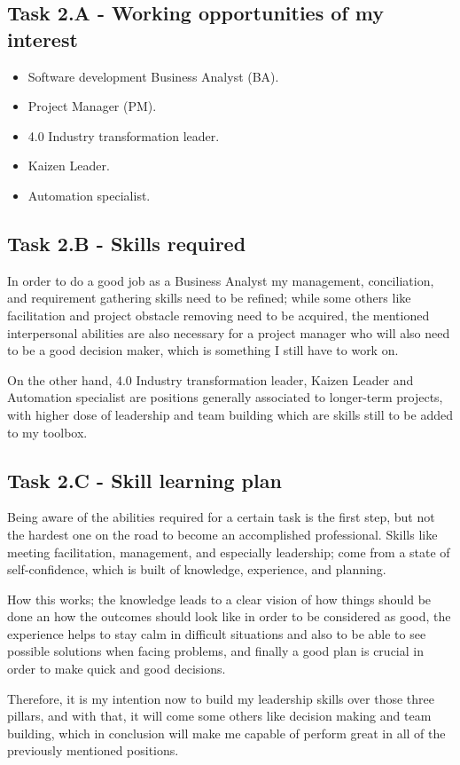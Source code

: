 \documentclass[a4paper, 12pt]{article}
\begin{document}
\subsection{Task 2.A - Working opportunities of my interest}
\begin{itemize}
\item Software development Business Analyst (BA).
\item Project Manager (PM).
\item 4.0 Industry transformation leader.
\item Kaizen Leader.
\item Automation specialist.
\end{itemize}
\subsection{Task 2.B - Skills required}

In order to do a good job as a Business Analyst my management, conciliation, and requirement gathering skills need to be refined; while some others like facilitation and project obstacle removing need to be acquired, the mentioned interpersonal abilities are also necessary for a project manager who will also need to be a good decision maker, which is something I still have to work on.

On the other hand, 4.0 Industry transformation leader, Kaizen Leader and Automation specialist are positions generally associated to longer-term projects, with higher dose of leadership and team building which are skills still to be added to my toolbox.

\subsection{Task 2.C - Skill learning plan}

Being aware of the abilities required for a certain task is the first step, but not the hardest one on the road to become an accomplished professional. Skills like meeting facilitation, management, and especially leadership; come from a state of self-confidence, which is built of knowledge, experience, and planning. 

How this works; the knowledge leads to a clear vision of how things should be done an how the outcomes should look like in order to be considered as good, the experience helps to stay calm in difficult situations and also to be able to see possible solutions when facing problems, and finally a good plan is crucial in order to make quick and  good decisions.

Therefore, it is my intention now to build my leadership skills over those three pillars, and with that, it will come some others like decision making and team building, which in conclusion will make me capable of perform great in all of the previously mentioned positions.
\end{document}
